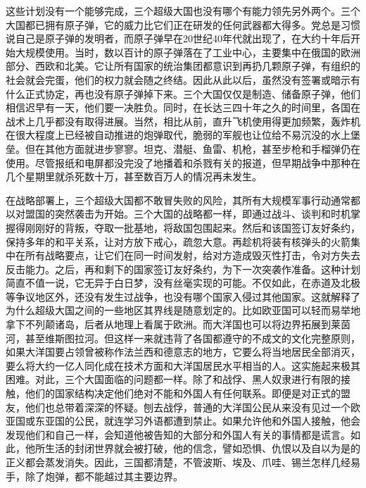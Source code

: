 这些计划没有一个能够完成，三个超级大国也没有哪个有能力领先另外两个。三个大国都已拥有原子弹，它的威力比它们正在研发的任何武器都大得多。党总是习惯说自己是原子弹的发明者，而原子弹早在20世纪40年代就出现了，在大约十年后开始大规模使用。当时，数以百计的原子弹落在了工业中心，主要集中在俄国的欧洲部分、西欧和北美。它让所有国家的统治集团都意识到再扔几颗原子弹，有组织的社会就会完蛋，他们的权力就会随之终结。因此从此以后，虽然没有签署或暗示有什么正式协定，再也没有原子弹掉下来。三个大国仅仅是制造、储备原子弹，他们相信迟早有一天，他们要一决胜负。同时，在长达三四十年之久的时间里，各国在战术上几乎都没有取得进展。当然，相比从前，直升飞机使用得更加频繁，轰炸机在很大程度上已经被自动推进的炮弹取代，脆弱的军舰也让位给不易沉没的水上堡垒。但在其他方面就进步寥寥。坦克、潜艇、鱼雷、机枪，甚至步枪和手榴弹仍在使用。尽管报纸和电屏都没完没了地播着和杀戮有关的报道，但早期战争中那种在几个星期里就杀死数十万，甚至数百万人的情况再未发生。

在战略部署上，三个超级大国都不敢冒失败的风险，其所有大规模军事行动通常都以对盟国的突然袭击为开始。三个大国的战略都一样，即通过战斗、谈判和时机掌握得刚刚好的背叛，夺取一批基地，将敌国包围起来。然后和该国签订友好条约，保持多年的和平关系，让对方放下戒心，疏忽大意。再趁机将装有核弹头的火箭集中在所有战略要点，让它们在同一时间发射，给对方造成毁灭性打击，令对方失去反击能力。之后，再和剩下的国家签订友好条约，为下一次突袭作准备。这种计划简直不值一说，它无异于白日梦，没有丝毫实现的可能。不仅如此，在赤道及北极等争议地区外，还没有发生过战争，也没有哪个国家入侵过其他国家。这就解释了为什么超级大国之间的一些地区其界线是随意划定的。比如欧亚国可以轻而易举地拿下不列颠诸岛，后者从地理上看属于欧洲。而大洋国也可以将边界拓展到莱茵河，甚至维斯图拉河。但这样一来就违背了各国都遵守的不成文的文化完整原则，如果大洋国要占领曾被称作法兰西和德意志的地方，它要么将当地居民全部消灭，要么将大约一亿人同化成在技术方面和大洋国居民水平相当的人。这实施起来极其困难。对此，三个大国面临的问题都一样。除了和战俘、黑人奴隶进行有限的接触，他们的国家结构决定他们绝对不能和外国人有任何联系。即便是对正式的盟友，他们也总带着深深的怀疑。刨去战俘，普通的大洋国公民从来没有见过一个欧亚国或东亚国的公民，就连学习外语都遭到禁止。如果允许他和外国人接触，他会发现他们和自己一样，会知道他被告知的大部分和外国人有关的事情都是谎言。如此，他所生活的封闭世界就会被打破，他的信念，譬如恐惧、仇恨以及自以为是的正义都会蒸发消失。因此，三国都清楚，不管波斯、埃及、爪哇、锡兰怎样几经易手，除了炮弹，都不能越过其主要边界。


